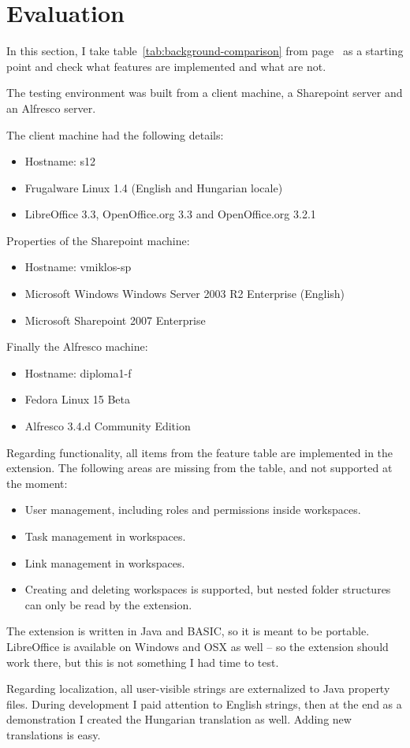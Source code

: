 \section{Evaluation}

In this section, I take table~\ref{tab:background-comparison} from
page~\pageref{tab:background-comparison} as a starting point and check what
features are implemented and what are not.

The testing environment was built from a client machine, a Sharepoint server
and an Alfresco server.

The client machine had the following details:
\begin{itemize}
\item Hostname: s12
\item Frugalware Linux 1.4 (English and Hungarian locale)
\item LibreOffice 3.3, OpenOffice.org 3.3 and OpenOffice.org 3.2.1
\end{itemize}

Properties of the Sharepoint machine:

\begin{itemize}
\item Hostname: vmiklos-sp
\item Microsoft Windows Windows Server 2003 R2 Enterprise (English)
\item Microsoft Sharepoint 2007 Enterprise
\end{itemize}

Finally the Alfresco machine:

\begin{itemize}
\item Hostname: diploma1-f
\item Fedora Linux 15 Beta
\item Alfresco 3.4.d Community Edition
\end{itemize}

Regarding functionality, all items from the feature table are implemented in
the extension. The following areas are missing from the table, and not
supported at the moment:

\begin{itemize}
\item User management, including roles and permissions inside workspaces.
\item Task management in workspaces.
\item Link management in workspaces.
\item Creating and deleting workspaces is supported, but nested folder
structures can only be read by the extension.
\end{itemize}

The extension is written in Java and BASIC, so it is meant to be portable.
LibreOffice is available on Windows and OSX as well -- so the extension should
work there, but this is not something I had time to test.

Regarding localization, all user-visible strings are externalized to Java
property files. During development I paid attention to English strings, then at
the end as a demonstration I created the Hungarian translation as well. Adding
new translations is easy.
